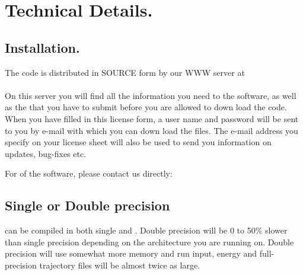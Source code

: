 %
% 
% 
% 
% 
% 
% 
% 
% 
%

\chapter{Technical Details.}
\label{ch:install}
\section{Installation.}
The {\gromacs} code is distributed in SOURCE form by our WWW server at\\
{\wwwpage}\\
On this server you will find all the information you need to 
the software, as well as the  that you have to submit
before you are allowed to down load the code. When you have filled in this
license form, a user name and password will be sent to you by e-mail
with which you can down load the files. The e-mail address you specify
on your license sheet will also be used to send you information on
updates, bug-fixes etc.

For  of the software, please contact us
directly: {\email}

\section{Single or Double precision}
{\gromacs} can be compiled in both single
and .
Double precision will be 0 to 50\% slower than single precision depending
on the architecture you are running on. Double precision will use somewhat more
memory and run input, energy and full-precision trajectory files will be
almost twice as large.

